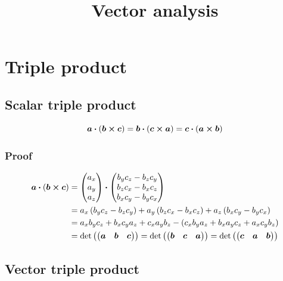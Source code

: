 \documentclass{article}
\title{Vector analysis}
\author{}
\date{}
\renewcommand{\vec}[1]{\boldsymbol{#1}}
\begin{document}
\maketitle

\section{Triple product}
\subsection{Scalar triple product}

\[ \vec{a} \vdot \left( \vec{b} \cross \vec{c} \right) = \vec{b} \vdot \left( \vec{c} \cross \vec{a} \right) = \vec{c} \vdot \left( \vec{a} \cross \vec{b} \right) \]

\subsubsection{Proof}

\begin{align*}
    \vec{a} \vdot \left( \vec{b} \cross \vec{c} \right) &= \begin{pmatrix} a_x \\ a_y \\ a_z \end{pmatrix} \vdot \begin{pmatrix} b_y c_z - b_z c_y \\ b_z c_x - b_x c_z \\ b_x c_y - b_y c_x \end{pmatrix} \\
    &= a_x \left( b_y c_z - b_z c_y \right) + a_y \left( b_z c_x - b_x c_z \right) + a_z \left( b_x c_y - b_y c_x \right) \\
    &= a_x b_y c_z + b_x c_y a_z + c_x a_y b_z - \left( c_x b_y a_z + b_x a_y c_z + a_x c_y b_z \right) \\
    &= \det\left(\begin{pmatrix} \vec{a} & \vec{b} & \vec{c} \end{pmatrix}\right) = \det\left(\begin{pmatrix} \vec{b} & \vec{c} & \vec{a} \end{pmatrix}\right) = \det\left(\begin{pmatrix} \vec{c} & \vec{a} & \vec{b} \end{pmatrix}\right)
\end{align*}


\subsection{Vector triple product}
\end{document}
